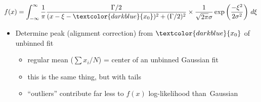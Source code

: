 \documentclass[compress]{beamer}
\begin{document}
\begin{frame}
\vspace{0.45 cm}
\[ f(x) = \int_{-\infty}^\infty \frac{1}{\pi}\frac{\Gamma/2}{(x - \xi - \textcolor{darkblue}{x_0})^2 + (\Gamma/2)^2} \times 
\frac{1}{\sqrt{2\pi} \sigma} \exp\left(\frac{-\xi^2}{2 \sigma^2}\right) \, d\xi \]

\vspace{0.15 cm}
\hspace{-0.45 cm}
\begin{minipage}{\linewidth}
\begin{itemize}
\item Determine peak (alignment correction) from $\textcolor{darkblue}{x_0}$ of unbinned fit
\begin{itemize}\setlength{\itemsep}{0.1 cm}
\item regular mean ($\sum x_i/N$) = center of an unbinned Gaussian fit
\item this is the same thing, but with tails
\item ``outliers'' contribute far less to $f(x)$ log-likelihood \mbox{than Gaussian\hspace{-1 cm}}
\end{itemize}
\end{itemize}
\end{minipage}
\end{frame}
\end{document}
